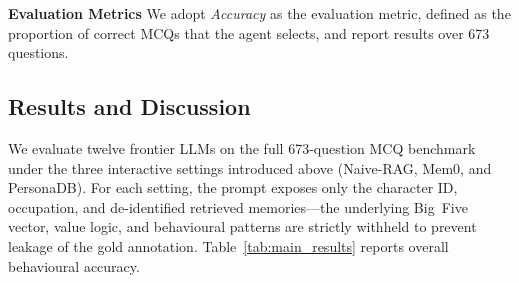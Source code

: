 \documentclass{article}
\begin{document}
\textbf{Evaluation Metrics}
We adopt \textit{Accuracy} as the evaluation metric, defined as the proportion of correct MCQs that the agent selects, and report results over 673 questions.

\subsection{Results and Discussion}
We evaluate twelve frontier LLMs on the full 673-question MCQ benchmark under the three interactive settings introduced above (Naive-RAG, Mem0, and PersonaDB). For each setting, the prompt exposes only the character ID, occupation, and de-identified retrieved memories—the underlying Big~Five vector, value logic, and behavioural patterns are strictly withheld to prevent leakage of the gold annotation. Table~\ref{tab:main_results} reports overall behavioural accuracy.
\end{document}
